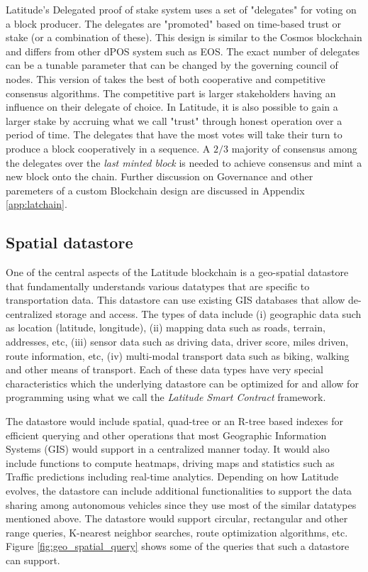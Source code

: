 Latitude's Delegated proof of stake system uses a set of "delegates" for voting on a block producer. The delegates are
"promoted" based on time-based trust or stake (or a combination of these). This design is similar to the Cosmos
blockchain and differs from other dPOS system such as EOS. The exact number of delegates can be a tunable parameter that
can be changed by the governing council of nodes. This version of takes the best of both cooperative and competitive
consensus algorithms.  The competitive part is larger stakeholders having an influence on their delegate of choice. In
Latitude, it is also possible to gain a larger stake by accruing what we call "trust" through honest operation over a
period of time. The delegates that have the most votes will take their turn to produce a block cooperatively in a
sequence. A $2/3$ majority of consensus among the delegates over the {\em last minted block} is needed to achieve
consensus and mint a new block onto the chain. Further discussion on Governance and other paremeters of a custom
Blockchain design are discussed in Appendix \ref{app:latchain}.

\subsection{Spatial datastore}
One of the central aspects of the Latitude blockchain is a geo-spatial datastore that fundamentally understands various
datatypes that are specific to transportation data. This datastore can use existing GIS databases that allow
de-centralized storage and access. The types of data include (i) geographic data such as location (latitude, longitude),
(ii) mapping data such as roads, terrain, addresses, etc, (iii) sensor data such as driving data, driver score, miles
driven, route information, etc, (iv) multi-modal transport data such as biking, walking and other means of transport.
Each of these data types have very special characteristics which the underlying datastore can be optimized for and allow
for programming using what we call the {\em Latitude Smart Contract} framework. 

The datastore would include spatial, quad-tree or an R-tree based indexes for efficient querying and other operations that
most Geographic Information Systems (GIS) would support in a centralized manner today. It would also include functions
to compute heatmaps, driving maps and statistics such as Traffic predictions including real-time analytics. Depending on
how Latitude evolves, the datastore can include additional functionalities to support the data sharing among autonomous
vehicles since they use most of the similar datatypes mentioned above. The datastore would support circular, rectangular
and other range queries, K-nearest neighbor searches, route optimization algorithms, etc. Figure
\ref{fig:geo_spatial_query} shows some of the queries that such a datastore can support.

